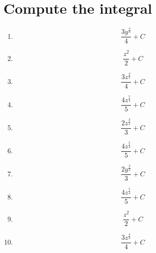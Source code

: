 \documentclass{article}
\begin{document}
        \section{Compute the integral}
        
        \begin{enumerate}
        \item$$\frac{3 y^{\frac{4}{3}}}{4} + C $$
\item$$\frac{z^{2}}{2} + C $$
\item$$\frac{3 z^{\frac{4}{3}}}{4} + C $$
\item$$\frac{4 z^{\frac{5}{4}}}{5} + C $$
\item$$\frac{2 z^{\frac{3}{2}}}{3} + C $$
\item$$\frac{4 z^{\frac{5}{4}}}{5} + C $$
\item$$\frac{2 y^{\frac{3}{2}}}{3} + C $$
\item$$\frac{4 z^{\frac{5}{4}}}{5} + C $$
\item$$\frac{z^{2}}{2} + C $$
\item$$\frac{3 z^{\frac{4}{3}}}{4} + C $$
        \end{enumerate}
        

    
\end{document}
